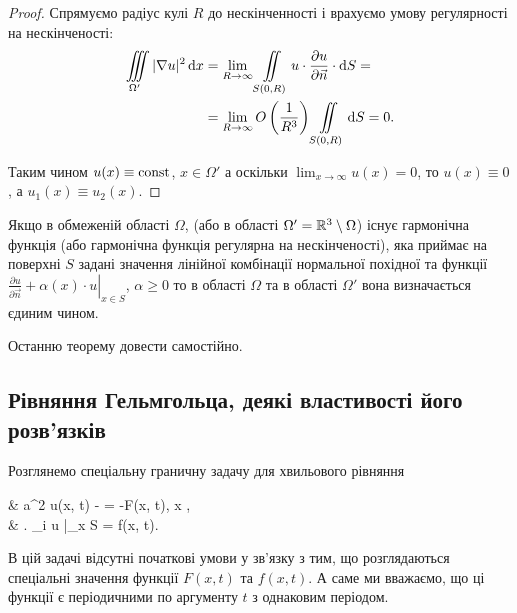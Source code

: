 \begin{proof}
	Спрямуємо радіус кулі $R$ до нескінченності і врахуємо умову регулярності на нескінченості:
	\begin{equation}
		\begin{aligned}
			\displaystyle\iiint\limits_{\Omega'} |\nabla u|^2 \mathop{}\!\mathrm{d} x &= \displaystyle\lim\limits_{R \to \infty} \displaystyle\iint\limits_{S(0, R)} u \cdot \frac{\partial u}{\partial \vec n} \cdot \mathop{}\!\mathrm{d} S = \\
			&= \displaystyle\lim\limits_{R \to \infty} O \left( \frac{1}{R^3} \right) \displaystyle\iint\limits_{S(0, R)} \mathop{}\!\mathrm{d} S = 0.
		\end{aligned}
	\end{equation}

	Таким чином $u(x) \equiv \operatorname{const}$, $x \in \Omega'$ а оскільки $\lim_{x \to \infty} u(x) = 0$, то $u(x) \equiv 0$, а $u_1(x) \equiv u_2(x)$.
\end{proof}

\begin{theorem}
	Якщо в обмеженій області $\Omega$, (або в області $\Omega' = \mathbb{R}^3 \setminus \Omega$) існує гармонічна функція (або гармонічна функція регулярна на нескінченості), яка приймає на поверхні $S$ задані значення лінійної комбінації нормальної похідної та функції $\left. \frac{\partial u}{\partial \vec n} + \alpha(x) \cdot u \right|_{x \in S}$, $\alpha \ge 0$ то в області $\Omega$ та в області $\Omega'$ вона визначається єдиним чином. 
\end{theorem}

\begin{exercise}
	Останню теорему довести самостійно.
\end{exercise}

\subsection{Рівняння Гельмгольца, деякі властивості його \allowbreak роз\-в'яз\-ків}

\begin{example}
	Розглянемо спеціальну граничну задачу для хвильового рівняння
	\begin{system}
		\label{eq:4.6.1}
		& a^2 \Delta u(x, t) -  = -F(x, t), \quad x \in \Omega, \\
		& \left. \ell_i u \right|_{x \in S} = f(x, t).
	\end{system}
\end{example}

\begin{remark}
	В цій задачі відсутні початкові умови у зв'язку з тим, що розглядаються спеціальні значення функції $F(x, t)$ та $f(x, t)$. А саме ми вважаємо, що ці функції є періодичними по аргументу $t$ з однаковим періодом.
\end{remark}

